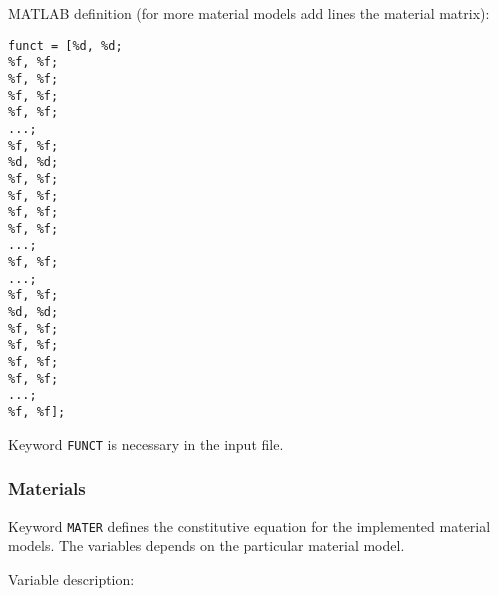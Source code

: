 MATLAB definition (for more material models add lines the material matrix):

\begin{tcolorbox}
\texttt{funct = [\%d, \%d; \\
                       \%f, \%f; \\
                       \%f, \%f; \\
                       \%f, \%f; \\
                       \%f, \%f; \\
                       ...; \\
                       \%f, \%f; \\
                      \%d, \%d; \\
                       \%f, \%f; \\
                       \%f, \%f; \\
                       \%f, \%f; \\
                       \%f, \%f; \\
                       ...; \\
                       \%f, \%f; \\
                       ...; \\
                       \%f, \%f; \\
                      \%d, \%d; \\
                       \%f, \%f; \\
                       \%f, \%f; \\
                       \%f, \%f; \\
                       \%f, \%f; \\
                       ...; \\
                       \%f, \%f];}
\end{tcolorbox}

Keyword \texttt{FUNCT} is necessary in the input file.

\newpage


\subsubsection{Materials}

Keyword \texttt{MATER} defines the constitutive equation for the implemented material models. The variables depends on the particular material model.

Variable description:


